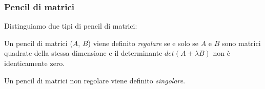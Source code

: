 \begin{frame}
	\frametitle{Pencil di matrici}
	Distinguiamo due tipi di pencil di matrici:
	\begin{definition}
		Un pencil di matrici ($A$, $B$) viene definito \emph{regolare} se e solo se
		$A$ e $B$ sono matrici quadrate della stessa dimensione e il determinante
		$det(A+\lambda B)$ non \`e identicamente zero.
	\end{definition}
	\begin{definition}
			Un pencil di matrici non regolare viene definito \emph{singolare}.
	\end{definition}
\end{frame}